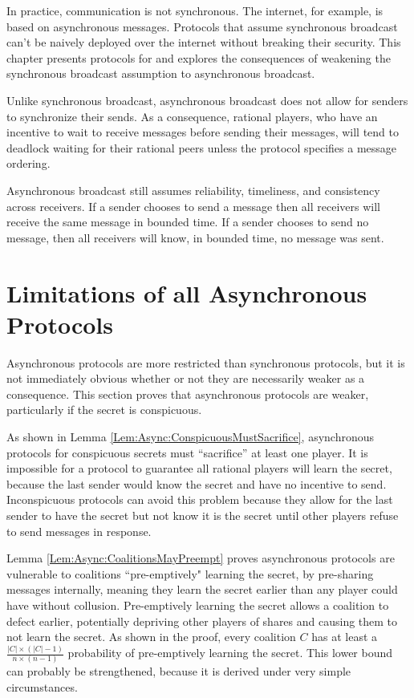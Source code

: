 \documentclass{dalcsthesis}
\begin{document}
In practice, communication is not synchronous. The internet, for example, is based on asynchronous messages. Protocols that assume synchronous broadcast can't be naively deployed over the internet without breaking their security. This chapter presents protocols for and explores the consequences of weakening the synchronous broadcast assumption to asynchronous broadcast.

Unlike synchronous broadcast, asynchronous broadcast does not allow for senders to synchronize their sends. As a consequence, rational players, who have an incentive to wait to receive messages before sending their messages, will tend to deadlock waiting for their rational peers unless the protocol specifies a message ordering.

Asynchronous broadcast still assumes reliability, timeliness, and consistency across receivers. If a sender chooses to send a message then all receivers will receive the same message in bounded time. If a sender chooses to send no message, then all receivers will know, in bounded time, no message was sent.

\section{Limitations of all Asynchronous Protocols}

Asynchronous protocols are more restricted than synchronous protocols, but it is not immediately obvious whether or not they are necessarily weaker as a consequence. This section proves that asynchronous protocols are weaker, particularly if the secret is conspicuous.

As shown in Lemma \ref{Lem:Async:ConspicuousMustSacrifice}, asynchronous protocols for conspicuous secrets must ``sacrifice'' at least one player. It is impossible for a protocol to guarantee all rational players will learn the secret, because the last sender would know the secret and have no incentive to send. Inconspicuous protocols can avoid this problem because they allow for the last sender to have the secret but not know it is the secret until other players refuse to send messages in response.

Lemma \ref{Lem:Async:CoalitionsMayPreempt} proves asynchronous protocols are vulnerable to coalitions ``pre-emptively" learning the secret, by pre-sharing messages internally, meaning they learn the secret earlier than any player could have without collusion. Pre-emptively learning the secret allows a coalition to defect earlier, potentially depriving other players of shares and causing them to not learn the secret. As shown in the proof, every coalition $C$ has at least a $\frac{|C| \times (|C| - 1)}{n \times (n-1)}$ probability of pre-emptively learning the secret. This lower bound can probably be strengthened, because it is derived under very simple circumstances.
\end{document}
